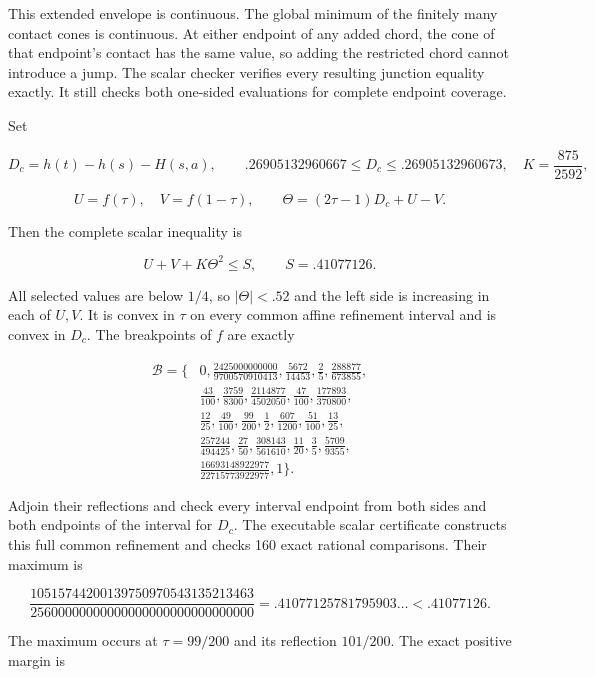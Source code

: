 This extended envelope is continuous. The global minimum of the finitely many contact cones is continuous. At either endpoint of any added chord, the cone of that endpoint's contact has the same value, so adding the restricted chord cannot introduce a jump. The scalar checker verifies every resulting junction equality exactly. It still checks both one-sided evaluations for complete endpoint coverage.

Set

\[
D_c=h(t)-h(s)-H(s,a),\qquad
 .26905132960667\le D_c\le .26905132960673,
 \quad K=\frac{875}{2592},
\]

\[
U=f(\tau),\quad V=f(1-\tau),\qquad
 \Theta=(2\tau-1)D_c+U-V.
\]

Then the complete scalar inequality is

\[
\boxed{U+V+K\Theta^2\le S,\qquad S=.41077126.}
 \tag{XSS22}
\]

All selected values are below \(1/4\), so \(|\Theta|<.52\) and the left side is increasing in each of \(U,V\). It is convex in \(\tau\) on every common affine refinement interval and is convex in \(D_c\). The breakpoints of \(f\) are exactly

\[
\begin{aligned}
\mathcal B=\bigl\{&
0,\frac{2425000000000}{9700570910413},\frac{5672}{14453},
\frac25,\frac{288877}{673855},\\
&\frac{43}{100},\frac{3759}{8300},\frac{2114877}{4502050},
\frac{47}{100},\frac{177893}{370800},\\
&\frac{12}{25},\frac{49}{100},\frac{99}{200},\frac12,\frac{607}{1200},
\frac{51}{100},\frac{13}{25},\\
&\frac{257244}{494425},\frac{27}{50},\frac{308143}{561610},
\frac{11}{20},\frac35,\frac{5709}{9355},\\
&\frac{16693148922977}{22715773922977},1\bigr\}.
\end{aligned}
\tag{XSS23}
\]

Adjoin their reflections and check every interval endpoint from both sides and both endpoints of the interval for \(D_c\). The executable scalar certificate constructs this full common refinement and checks 160 exact rational comparisons. Their maximum is

\[
\frac{10515744200139750970543135213463}
 {25600000000000000000000000000000}
 =.41077125781795903\ldots < .41077126.
 \tag{XSS24}
\]

The maximum occurs at \(\tau=99/200\) and its reflection \(101/200\). The exact positive margin is


